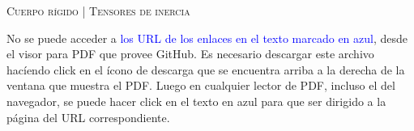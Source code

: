 \documentclass[11pt, spanish, a4paper, twoside]{article}
\begin{document}
\begin{center}
  \textsc{\large Cuerpo rígido | Tensores de inercia}
\end{center}

No se puede acceder a \textcolor{blue}{los URL de los enlaces en el texto marcado en azul}, desde el visor para PDF que provee GitHub.
Es necesario descargar este archivo hacíendo click en el ícono de descarga que se encuentra arriba a la derecha de la ventana que muestra el PDF. 
Luego en cualquier lector de PDF, incluso el del navegador, se puede hacer click en el texto en azul para que ser dirigido a la página del URL correspondiente.
\end{document}
